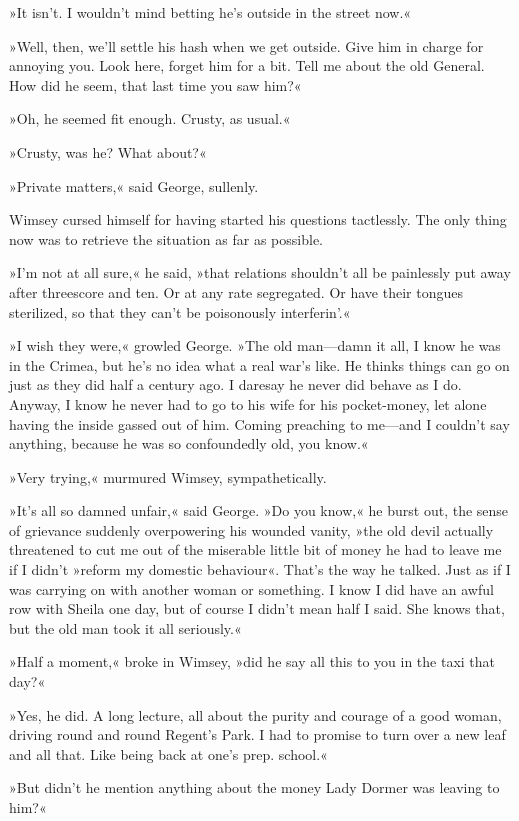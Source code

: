 »It isn't. I wouldn't mind betting he's outside in the street now.«

»Well, then, we'll settle his hash when we get outside. Give him in charge for annoying you. Look here, forget him for a bit. Tell me about the old General. How did he seem, that last time you saw him?«

»Oh, he seemed fit enough. Crusty, as usual.«

»Crusty, was he? What about?«

»Private matters,« said George, sullenly.

Wimsey cursed himself for having started his questions tactlessly. The only thing now was to retrieve the situation as far as possible.

»I'm not at all sure,« he said, »that relations shouldn't all be painlessly put away after threescore and ten. Or at any rate segregated. Or have their tongues sterilized, so that they can't be poisonously interferin'.«

»I wish they were,« growled George. »The old man—damn it all, I know he was in the Crimea, but he's no idea what a real war's like. He thinks things can go on just as they did half a century ago. I daresay he never did behave as I do. Anyway, I know he never had to go to his wife for his pocket-money, let alone having the inside gassed out of him. Coming preaching to me—and I couldn't say anything, because he was so confoundedly old, you know.«

»Very trying,« murmured Wimsey, sympathetically.

»It's all so damned unfair,« said George. »Do you know,« he burst out, the sense of grievance suddenly overpowering his wounded vanity, »the old devil actually threatened to cut me out of the miserable little bit of money he had to leave me if I didn't »reform my domestic behaviour«. That's the way he talked. Just as if I was carrying on with another woman or something. I know I did have an awful row with Sheila one day, but of course I didn't mean half I said. She knows that, but the old man took it all seriously.«

»Half a moment,« broke in Wimsey, »did he say all this to you in the taxi that day?«

»Yes, he did. A long lecture, all about the purity and courage of a good woman, driving round and round Regent's Park. I had to promise to turn over a new leaf and all that. Like being back at one's prep. school.«

»But didn't he mention anything about the money Lady Dormer was leaving to him?«


